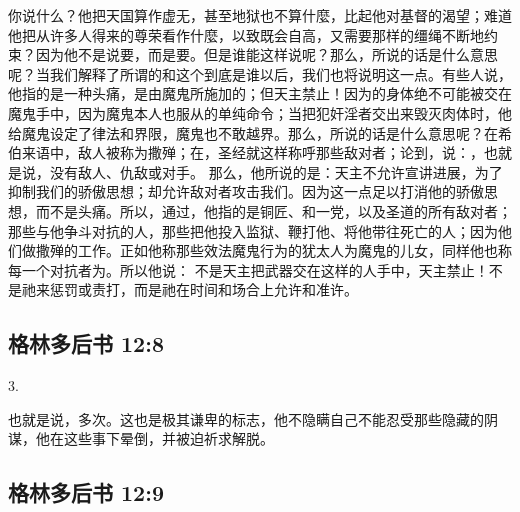 你说什么？他把天国算作虚无，甚至地狱也不算什麼，比起他对基督的渴望；难道他把从许多人得来的尊荣看作什麼，以致既会自高，又需要那样的缰绳不断地约束？因为他不是说要，而是要。但是谁能这样说呢？那么，所说的话是什么意思呢？当我们解释了所谓的和这个到底是谁以后，我们也将说明这一点。有些人说，他指的是一种头痛，是由魔鬼所施加的；但天主禁止！因为的身体绝不可能被交在魔鬼手中，因为魔鬼本人也服从的单纯命令；当把犯奸淫者交出来毁灭肉体时，他给魔鬼设定了律法和界限，魔鬼也不敢越界。那么，所说的话是什么意思呢？在希伯来语中，敌人被称为撒殚；在，圣经就这样称呼那些敌对者；论到，说：，也就是说，没有敌人、仇敌或对手。 那么，他所说的是：天主不允许宣讲进展，为了抑制我们的骄傲思想；却允许敌对者攻击我们。因为这一点足以打消他的骄傲思想，而不是头痛。所以，通过，他指的是铜匠、和一党，以及圣道的所有敌对者；那些与他争斗对抗的人，那些把他投入监狱、鞭打他、将他带往死亡的人；因为他们做撒殚的工作。正如他称那些效法魔鬼行为的犹太人为魔鬼的儿女，同样他也称每一个对抗者为。所以他说： 不是天主把武器交在这样的人手中，天主禁止！不是祂来惩罚或责打，而是祂在时间和场合上允许和准许。\par


\subsection{格林多后书 12:8}

3. \par

也就是说，多次。这也是极其谦卑的标志，他不隐瞒自己不能忍受那些隐藏的阴谋，他在这些事下晕倒，并被迫祈求解脱。\par


\subsection{格林多后书 12:9}

\par


